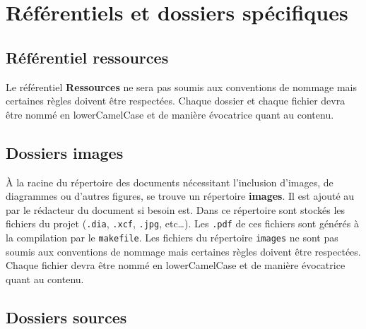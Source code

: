 
\section{Référentiels et dossiers spécifiques}

\subsection{Référentiel ressources}

Le référentiel \textbf{Ressources} ne sera pas soumis aux conventions de nommage mais certaines règles doivent être respectées. Chaque dossier et chaque fichier devra être nommé en lowerCamelCase et de manière évocatrice quant au contenu. 

\subsection{Dossiers images}

\`{A} la racine du répertoire des documents nécessitant l'inclusion d'images, de diagrammes ou
d'autres figures, se trouve un répertoire \textbf{images}. Il est ajouté au \git{} par le
rédacteur du document si besoin est. Dans ce répertoire sont stockés les fichiers du projet
(\verb+.dia+, \verb+.xcf+, \verb+.jpg+, etc\dots). Les \verb+.pdf+ de ces fichiers sont générés
à la compilation par le \verb+makefile+.
Les fichiers du répertoire \verb+images+ ne sont pas soumis aux conventions de nommage mais certaines règles doivent être respectées. Chaque fichier devra être nommé en lowerCamelCase et de manière évocatrice quant au contenu. 

\subsection{Dossiers sources}

